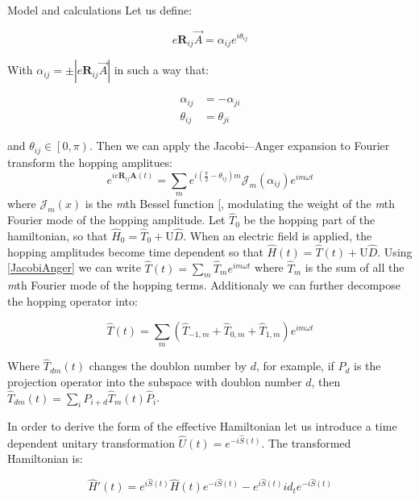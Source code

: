 \documentclass[aps,prl,twocolumn,amsmath,amssymb,superscriptaddress,nobibnotes]{revtex4}%
\renewcommand{\cite}[1]{{[}\onlinecite{#1}{]}}
\newcommand{\bs}{\boldsymbol}
\begin{document}
\begin{section}{Model and calculations}
Let us define:

\begin{equation}
\label{Def_alpha}
e\bs{R}_{ij}\vec{A} = \alpha_{ij} e^{i \theta_{ij}}
\end{equation}

With $\alpha_{ij} = \pm|e\bs{R}_{ij}\vec{A}|$ in such a way that:

\begin{align}
\alpha_{ij} &= -\alpha_{ji} \label{alphaSym} \\
\theta_{ij} &= \theta_{ji} \label{thetaSym}
\end{align}

and $\theta_{ij} \in \left[0,\pi\right)$. Then we can apply the Jacobi-–Anger expansion to Fourier transform the hopping amplitues:
\begin{equation}
\label{JacobiAnger}
e^{ie\bs{R}_{ij}\bs{A}(t)} = \sum_m e^{i(\frac{\pi}{2}-\theta_{ij})m} \mathcal{J}_m(\alpha_{ij}) e^{im\omega t} 
\end{equation}
where $\mathcal{J}_m(x)$ is the \textit{m}th Bessel function \cite{Kitamura2017}, modulating the weight of the \textit{m}th Fourier mode of the hopping amplitude. Let $\hat{T}_0$ be the hopping part of the hamiltonian, so that $\hat{H}_0 = \hat{T}_0 + \text{U}\hat{D}$. When an electric field is applied, the hopping amplitudes become time dependent so that $\hat{H}(t) = \hat{T}(t) +  \text{U}\hat{D}$. Using \ref{JacobiAnger} we can write $\hat{T}(t) = \sum_m \hat{T}_m e^{im \omega t}$ where $\hat{T}_m$ is the sum of all the \textit{m}th Fourier mode of the hopping terms. Additionaly we can further decompose the hopping operator into:

\begin{equation}
\hat{T}(t) = \sum_m (\hat{T}_{-1,m}+\hat{T}_{0,m}+\hat{T}_{1,m})e^{im\omega t}
\end{equation}

Where $\hat{T}_{dm}(t)$ changes the doublon number by $d$, for example, if $\hat{P}_d$ is the projection operator into the subspace with doublon number $d$, then $\hat{T}_{dm}(t) = \sum_i \hat{P}_{i+d}\hat{T}_{m}(t)\hat{P}_i$.

In order to derive the form of the effective Hamiltonian let us introduce a time dependent unitary transformation $\hat{U}(t) = e^{-i\hat{S}(t)}$. The transformed Hamiltonian is:

\begin{equation}
\hat{H}'(t) = e^{i\hat{S}(t)} \hat{H}(t) e^{-i\hat{S}(t)} - e^{i\hat{S}(t)} id_t e^{-i\hat{S}(t)}
\label{Htransformed}
\end{equation} 


\end{section}
\end{document}
